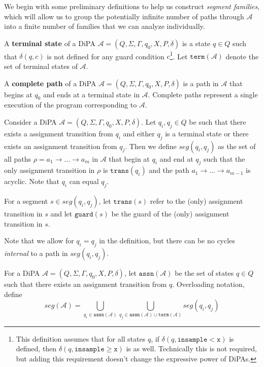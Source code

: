 \documentclass[12pt]{article}
\newcommand{\gguard}[1][x]{\texttt{insample}\geq \texttt{#1}}
\newcommand{\lguard}[1][x]{\texttt{insample} < \texttt{#1}}
\newcommand{\guard}{\texttt{guard}}
\newcommand{\trans}{\texttt{trans}}
\theoremstyle{definition}
\begin{document}
We begin with some preliminary definitions to help us construct \textit{segment families}, which will allow us to group the potentially infinite number of paths through $\mathcal{A}$ into a finite number of families that we can analyze individually.


\begin{defn}
	A \textbf{terminal state} of a DiPA $\mathcal{A}= (Q, \Sigma, \Gamma, q_0, X, P, \delta)$ is a state $q\in Q$ such that $\delta(q, c)$ is not defined for any guard condition $c$\footnote{This definition assumes that for all states $q$, if $\delta(q, \lguard)$ is defined, then $\delta(q, \gguard)$ is as well. Technically this is not required, but adding this requirement doesn't change the expressive power of DiPAs.}. 
	Let $\texttt{term}(\mathcal{A})$ denote the set of terminal states of $\mathcal{A}$. 
\end{defn}


\begin{defn}
	A \textbf{complete path} of a DiPA $\mathcal{A}= (Q, \Sigma, \Gamma, q_0, X, P, \delta)$ is a path in $\mathcal{A}$ that begins at $q_0$ and ends at a terminal state in $\mathcal{A}$. Complete paths represent a single execution of the program corresponding to $\mathcal{A}$. 
\end{defn}

\begin{defn}
	Consider a DiPA $\mathcal{A} = (Q, \Sigma, \Gamma, q_0, X, P, \delta)$. Let $q_i, q_j\in Q$ be such that there exists a assignment transition from $q_i$ and either $q_j$ is a terminal state or there exists an assignment transition from $q_j$. 
	Then we define $seg(q_i, q_j)$ as the set of all paths $\rho = a_1\to \ldots\to a_m$ in $\mathcal{A}$ that begin at $q_i$ and end at $q_j$ such that the only assignment transition in $\rho$ is $\trans(q_i)$ and the path $a_1\to\ldots \to a_{m-1}$ is acyclic. Note that $q_i$ can equal $q_j$. 

	For a segment $s\in seg(q_i, q_j)$, let $\trans(s)$ refer to the (only) assignment transition in $s$ and let $\guard(s)$ be the guard of the (only) assignment transition in $s$.
\end{defn}

Note that we allow for $q_i = q_j$ in the definition, but there can be no cycles \textit{internal} to a path in $seg(q_i, q_j)$. 

\begin{defn}
	For a DiPA $\mathcal{A}= (Q, \Sigma, \Gamma, q_0, X, P, \delta)$, let $\texttt{assn}(\mathcal{A})$ be the set of states $q\in Q$ such that there exists an assignment transition from $q$. Overloading notation, define \[seg(\mathcal{A}) = \bigcup_{q_i\in \texttt{assn}(\mathcal{A})}\bigcup_{q_j\in \texttt{assn}(\mathcal{A})\cup\texttt{term}(\mathcal{A})}seg(q_i, q_j)\]
\end{defn}
\end{document}
